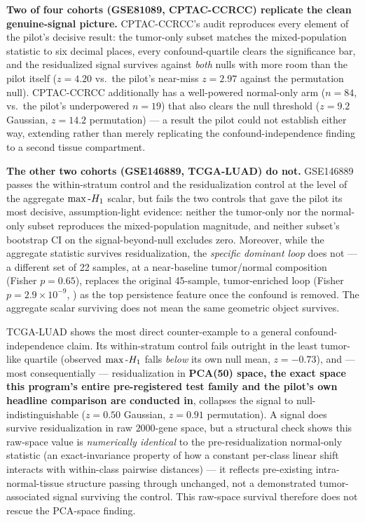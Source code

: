 \textbf{Two of four cohorts (GSE81089, CPTAC-CCRCC) replicate the clean genuine-signal picture.}
CPTAC-CCRCC's audit reproduces every element of the pilot's decisive result: the tumor-only subset matches
the mixed-population statistic to six decimal places, every confound-quartile clears the significance bar,
and the residualized signal survives against \emph{both} nulls with more room than the pilot itself
($z=4.20$ vs.\ the pilot's near-miss $z=2.97$ against the permutation null). CPTAC-CCRCC additionally has a
well-powered normal-only arm ($n=84$, vs.\ the pilot's underpowered $n=19$) that also clears the null
threshold ($z=9.2$ Gaussian, $z=14.2$ permutation) --- a result the pilot could not establish either way,
extending rather than merely replicating the confound-independence finding to a second tissue compartment.

\textbf{The other two cohorts (GSE146889, TCGA-LUAD) do not.} GSE146889 passes the within-stratum control
and the residualization control at the level of the aggregate $\max\text{-}H_1$ scalar, but fails the two controls
that gave the pilot its most decisive, assumption-light evidence: neither the tumor-only nor the
normal-only subset reproduces the mixed-population magnitude, and neither subset's bootstrap CI on the
signal-beyond-null excludes zero. Moreover, while the aggregate statistic survives residualization, the
\emph{specific dominant loop} does not --- a different set of 22 samples, at a near-baseline tumor/normal
composition (Fisher $p=0.65$), replaces the original 45-sample, tumor-enriched loop (Fisher $p=2.9\times10^{-9}$,
) as the top persistence feature once the confound is removed. The
aggregate scalar surviving does not mean the same geometric object survives.

TCGA-LUAD shows the most direct counter-example to a general confound-independence claim. Its within-stratum
control fails outright in the least tumor-like quartile (observed $\max\text{-}H_1$ falls \emph{below} its own null
mean, $z=-0.73$), and --- most consequentially --- residualization in \textbf{PCA(50) space, the exact space
this program's entire pre-registered test family and the pilot's own headline comparison are conducted in},
collapses the signal to null-indistinguishable ($z=0.50$ Gaussian, $z=0.91$ permutation). A signal does
survive residualization in raw $2000$-gene space, but a structural check shows this raw-space value is
\emph{numerically identical} to the pre-residualization normal-only statistic (an exact-invariance property
of how a constant per-class linear shift interacts with within-class pairwise distances) --- it reflects
pre-existing intra-normal-tissue structure passing through unchanged, not a demonstrated tumor-associated
signal surviving the control. This raw-space survival therefore does not rescue the PCA-space finding.


